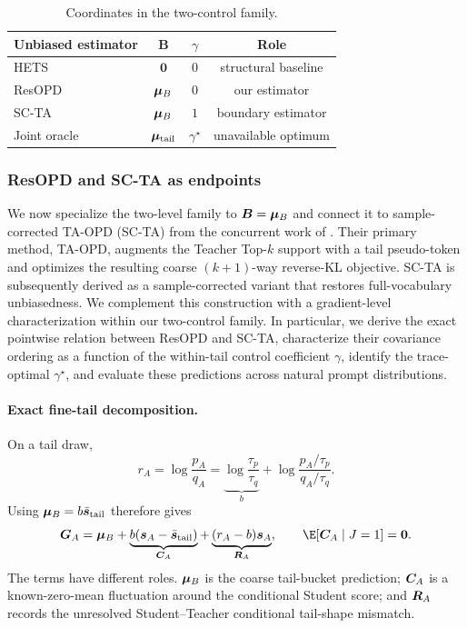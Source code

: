 \begin{table}[t]
\caption{Coordinates in the two-control family.}
\label{tab:estimator-map}
\centering
\begin{tabular*}{0.7\linewidth}{@{\extracolsep{\fill}} lccc @{}}
\toprule
Unbiased estimator & $\bm B$ & $\gamma$ & Role \\
\midrule
HETS & $\bm 0$ & $0$ & structural baseline \\
ResOPD & $\bm{\mu}_B$ & $0$ & our estimator \\
SC-TA & $\bm{\mu}_B$ & $1$ & boundary estimator \\
Joint oracle & $\bm{\mu}_{\mathrm{tail}}$ & $\gamma^\star$ & unavailable optimum \\
\bottomrule
\end{tabular*}
\end{table}
\subsubsection{ResOPD and SC-TA as endpoints}
\label{sec:gamma}

We now specialize the two-level family to $\bm B=\bm{\mu}_B$ and connect it to sample-corrected TA-OPD (SC-TA) from the concurrent work of \citet{huang2026tail}. Their primary method, TA-OPD, augments the Teacher Top-$k$ support with a tail pseudo-token and optimizes the resulting coarse $(k+1)$-way reverse-KL objective. SC-TA is subsequently derived as a sample-corrected variant that restores full-vocabulary unbiasedness. We complement this construction with a gradient-level characterization within our two-control family. In particular, we derive the exact pointwise relation between ResOPD and SC-TA, characterize their covariance ordering as a function of the within-tail control coefficient $\gamma$, identify the trace-optimal $\gamma^\star$, and evaluate these predictions across natural prompt distributions.

\paragraph{Exact fine-tail decomposition.}
On a tail draw,
\begin{equation}
 r_A
 =\log\frac{p_A}{q_A}
 =\underbrace{\log\frac{\tau_p}{\tau_q}}_{b}
 +\log\frac{p_A/\tau_p}{q_A/\tau_q}.
\end{equation}
Using $\bm{\mu}_B=b\bar{\bm{s}}_{\mathrm{tail}}$ therefore gives
\begin{equation}
 \btoken_A
 =\bmean_B
 +\underbrace{b(\bscore_A-\bar{\bscore}_{\mathrm{tail}})}_{\bfluct_A}
 +\underbrace{(r_A-b)\bscore_A}_{\bresid_A},
 \qquad
 \E[\bfluct_A\mid J=1]=\bm 0.
 \label{eq:tail-exact-decomposition}
\end{equation}
The terms have different roles. $\bm{\mu}_B$ is the coarse tail-bucket prediction; $\bm{C}_A$ is a known-zero-mean fluctuation around the conditional Student
score; and $\bm{R}_A$ records the unresolved Student--Teacher conditional
tail-shape mismatch.

